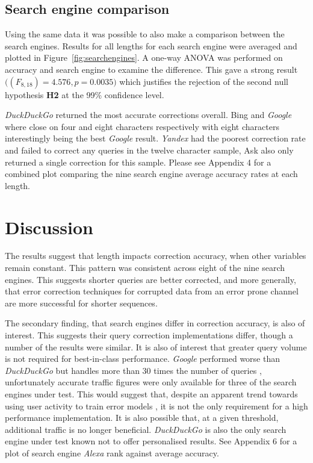 \documentclass{csfourzero}
\begin{document}
\subsection{Search engine comparison}
Using the same data it was possible to also make a comparison between the search engines. Results for all lengths for each search engine were averaged and plotted in Figure~\ref{fig:searchengines}. A one-way ANOVA was performed on accuracy and search engine to examine the difference. This gave a strong result $\big((F_{8,18}) = 4.576, p = 0.0035\big)$ which justifies the rejection of the second null hypothesis \textbf{H2} at the 99\% confidence level.

\textit{DuckDuckGo} returned the most accurate corrections overall. Bing and \textit{Google} where close on four and eight characters respectively with eight characters interestingly being the best \textit{Google} result. \textit{Yandex} had the poorest correction rate and failed to correct any queries in the twelve character sample, Ask also only returned a single correction for this sample. Please see Appendix 4 for a combined plot comparing the nine search engine average accuracy rates at each length.

\section{Discussion}
\label{sec:discuss}

The results suggest that length impacts correction accuracy, when other variables remain constant. This pattern was consistent across eight of the nine search engines. This suggests shorter queries are better corrected, and more generally, that error correction techniques for corrupted data from an error prone channel are more successful for shorter sequences.

The secondary finding, that search engines differ in correction accuracy, is also of interest. This suggests their query correction implementations differ, though a number of the results were similar. It is also of interest that greater query volume is not required for best-in-class performance. \textit{Google} performed worse than \textit{DuckDuckGo} but handles more than 30 times the number of queries \cite{enginecomparewiki}, unfortunately accurate traffic figures were only available for three of the search engines under test. This would suggest that, despite an apparent trend towards using user activity to train error models \cite{webuserpoweredspelling, webuser3, webuser2learningerrormodel, webuser4google2009}, it is not the only requirement for a high performance implementation. It is also possible that, at a given threshold, additional traffic is no longer beneficial. \textit{DuckDuckGo} is also the only search engine under test known not to offer personalised results. See Appendix 6 for a plot of search engine \textit{Alexa} rank against average accuracy.
\end{document}
